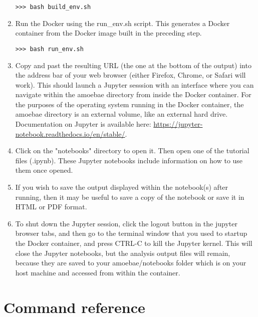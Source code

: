 \documentclass[12pt,letterpaper]{article}
\begin{document}
\begin{linenumbers}
\begin{enumerate}
\begin{lstlisting}
>>> bash build_env.sh
\end{lstlisting}


\item Run the Docker using the run\_env.sh script. This generates a Docker
    container from the Docker image built in the preceding step. 

\begin{lstlisting}
>>> bash run_env.sh
\end{lstlisting}


\item Copy and past the resulting URL (the one at the bottom of the output)
    into the address bar of your web browser (either Firefox, Chrome, or Safari
    will work). This should launch a Jupyter sesssion with an interface where
    you can navigate within the amoebae directory from inside the Docker
    container.  For the purposes of the operating system running in the Docker
    container, the amoebae directory is an external volume, like an external
    hard drive. Documentation on Jupyter is available here:
    \url{https://jupyter-notebook.readthedocs.io/en/stable/}. 



\item Click on the "notebooks" directory to open it. Then open one of the
    tutorial files (.ipynb). These Jupyter notebooks include information on how
    to use them once opened.


\item If you wish to save the output displayed within the notebook(s) after
    running, then it may be useful to save a copy of the notebook or save it in
    HTML or PDF format.


\item To shut down the Jupyter session, click the logout button in the jupyter
    browser tabs, and then go to the terminal window that you used to startup
    the Docker container, and press CTRL-C to kill the Jupyter kernel. This
    will close the Jupyter notebooks, but the analysis output files will
    remain, because they are saved to your amoebae/notebooks folder which is on
    your host machine and accessed from within the container.


\end{enumerate}

\section{Command reference}


\end{linenumbers}
\end{document}
